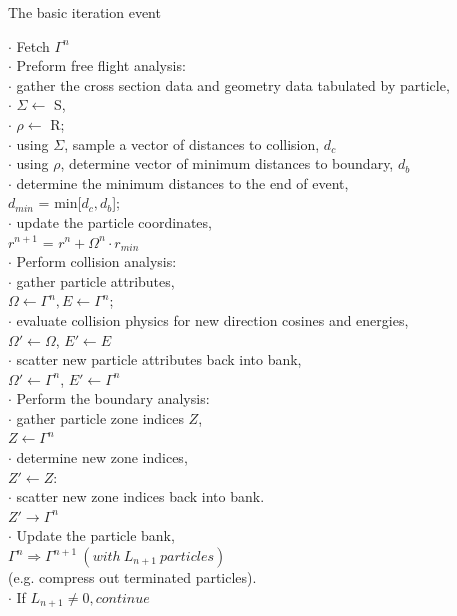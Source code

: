 %
\begin{algorithm}
\DontPrintSemicolon
\caption{The basic iteration event}
\label{alg:basicEvent}
{
	$\cdot$ Fetch $\Gamma^{n}$ \\
	$\cdot$ Preform free flight analysis:\\
	\Indp	$\cdot$ gather the cross section data and geometry data tabulated by particle,\\
		$\cdot$ $\Sigma \leftarrow$ S,\\
		$\cdot$ $\rho \leftarrow$ R;\\
		$\cdot$ using $\Sigma$, sample a vector of distances to collision, $d_{c}$\\
		$\cdot$ using $\rho$, determine vector of minimum distances to boundary, $d_{b}$\\
		$\cdot$ determine the minimum distances to the end of event,\\
		\Indp $d_{min}$ = min[$d_{c}, d_{b}$];\\
		\Indm $\cdot$ update the particle coordinates,\\
		\Indp $r^{n+1}$ = $r^{n} + \Omega^{n} \cdot r_{min}$\\
	\Indm $\cdot$ Perform collision analysis:\\
	\Indp $\cdot$ gather particle attributes,\\
	\Indp $\Omega \leftarrow \Gamma^{n}, E \leftarrow \Gamma^{n}$;\\
	\Indm $\cdot$ evaluate collision physics for new direction cosines and energies,\\
	\Indp $\Omega ' \leftarrow \Omega$, $E' \leftarrow  E$\\
	\Indm $\cdot$ scatter new particle attributes back into bank,\\
	\Indp $\Omega ' \leftarrow \Gamma^{n}$, $E' \leftarrow  \Gamma^{n}$\\
	\Indm \Indm $\cdot$ Perform the boundary analysis:\\
	\Indp $\cdot$ gather particle zone indices $Z$,\\
	\Indp $Z \leftarrow \Gamma^{n}$\\
	\Indm $\cdot$ determine new zone indices,\\
	\Indp $Z' \leftarrow Z:$\\
	\Indm $\cdot$ scatter new zone indices back into bank.\\
	\Indp $Z' \rightarrow \Gamma^{n}$\\
	\Indm \Indm $\cdot$ Update the particle bank,\\
	\Indp $\Gamma^{n} \Rightarrow \Gamma^{n+1}\ (with\ L_{n+1}\ particles )$ \\
	(e.g. compress out terminated particles).\\
	\Indm $\cdot$ If $L_{n+1} \neq 0, continue$\\
}
\end{algorithm}
%

